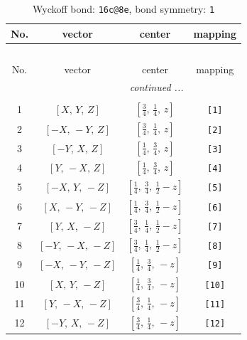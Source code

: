 \documentclass[fleqn,8pt]{jsarticle}
\begin{document}
\begin{longtable}{cccc}
\caption{Wyckoff bond: {\tt 16c@8e}, bond symmetry: {\tt 1}}
 \\
 \hline \hline
No. & vector & center & mapping \\ \hline \endfirsthead

\multicolumn{3}{l}{\tablename\ \thetable{}} \\
 \hline \hline
No. & vector & center & mapping \\ \hline \endhead

 \hline \hline
\multicolumn{3}{r}{\footnotesize\it continued ...} \\ \endfoot

 \hline \hline
\multicolumn{3}{r}{} \\ \endlastfoot

1 & $\left[ X,\, Y,\, Z \right]$ & $\left[ \frac{3}{4},\, \frac{1}{4},\, z \right]$ & {\tt [1]} \\ \hline
2 & $\left[ - X,\, - Y,\, Z \right]$ & $\left[ \frac{3}{4},\, \frac{1}{4},\, z \right]$ & {\tt [2]} \\ \hline
3 & $\left[ - Y,\, X,\, Z \right]$ & $\left[ \frac{1}{4},\, \frac{3}{4},\, z \right]$ & {\tt [3]} \\ \hline
4 & $\left[ Y,\, - X,\, Z \right]$ & $\left[ \frac{1}{4},\, \frac{3}{4},\, z \right]$ & {\tt [4]} \\ \hline
5 & $\left[ - X,\, Y,\, - Z \right]$ & $\left[ \frac{1}{4},\, \frac{3}{4},\, \frac{1}{2} - z \right]$ & {\tt [5]} \\ \hline
6 & $\left[ X,\, - Y,\, - Z \right]$ & $\left[ \frac{1}{4},\, \frac{3}{4},\, \frac{1}{2} - z \right]$ & {\tt [6]} \\ \hline
7 & $\left[ Y,\, X,\, - Z \right]$ & $\left[ \frac{3}{4},\, \frac{1}{4},\, \frac{1}{2} - z \right]$ & {\tt [7]} \\ \hline
8 & $\left[ - Y,\, - X,\, - Z \right]$ & $\left[ \frac{3}{4},\, \frac{1}{4},\, \frac{1}{2} - z \right]$ & {\tt [8]} \\ \hline
9 & $\left[ - X,\, - Y,\, - Z \right]$ & $\left[ \frac{1}{4},\, \frac{3}{4},\, - z \right]$ & {\tt [9]} \\ \hline
10 & $\left[ X,\, Y,\, - Z \right]$ & $\left[ \frac{1}{4},\, \frac{3}{4},\, - z \right]$ & {\tt [10]} \\ \hline
11 & $\left[ Y,\, - X,\, - Z \right]$ & $\left[ \frac{3}{4},\, \frac{1}{4},\, - z \right]$ & {\tt [11]} \\ \hline
12 & $\left[ - Y,\, X,\, - Z \right]$ & $\left[ \frac{3}{4},\, \frac{1}{4},\, - z \right]$ & {\tt [12]} \\ \hline

\end{longtable}
\end{document}
